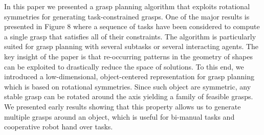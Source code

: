 \documentclass[a4paper,10pt,twocolumn]{article}
\begin{document}
In this paper we presented a grasp planning algorithm
that exploits rotational symmetries for generating task-constrained grasps. One of the major results is presented in Figure 8 where a sequence of tasks have been considered to compute a single grasp that satisfies all of their constraints. The algorithm is particularly suited for grasp planning with several subtasks or several interacting agents. The key insight of the paper is that re-occurring patterns in the geometry of shapes can be exploited to drastically reduce the space of solutions. To this end, we introduced a low-dimensional, object-centered representation for grasp planning which is based on rotational symmetries. Since such object are symmetric, any stable grasp can be rotated around the axis yielding a family of feasible grasps. We presented early results showing that this property allows us to generate multiple grasps around an object, which is useful for bi-manual tasks and cooperative robot hand over tasks.         


\end{document}
